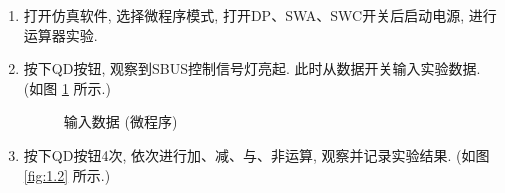 \documentclass[../main.tex]{subfiles}
\begin{document}
\begin{enumerate}

    \item 打开仿真软件, 选择微程序模式, 打开DP、SWA、SWC开关后启动电源, 进行运算器实验.

    \item 按下QD按钮, 观察到SBUS控制信号灯亮起. 此时从数据开关输入实验数据. (如图 \ref{fig:1.1} 所示.)

          \begin{figure}[hp]
              \centering
              \caption{输入数据 (微程序)}
              \label{fig:1.1}
          \end{figure}

    \item 按下QD按钮4次, 依次进行加、减、与、非运算, 观察并记录实验结果. (如图 \ref{fig:1.2} 所示.)


\end{enumerate}
\end{document}
